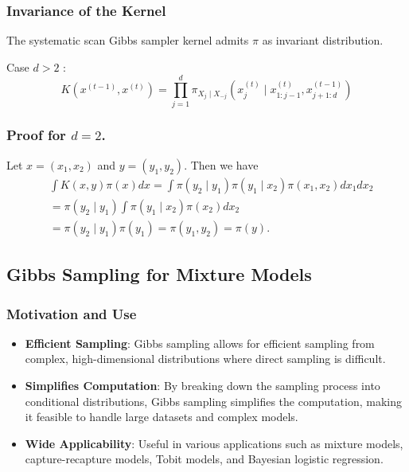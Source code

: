 \documentclass{article}
\begin{document}
\subsubsection{Invariance of the Kernel}
The systematic scan Gibbs sampler kernel admits $\pi$ as invariant distribution.

Case $d>2$ :
$$
K\left(x^{(t-1)}, x^{(t)}\right)=\prod_{j=1}^d \pi_{X_j \mid X_{-j}}\left(x_j^{(t)} \mid x_{1: j-1}^{(t)}, x_{j+1: d}^{(t-1)}\right)
$$

\subsubsection{Proof for $d=2$.}
Let $x=\left(x_1, x_2\right)$ and $y=\left(y_1, y_2\right)$. Then we have
$$
\begin{aligned}
& \int K(x, y) \pi(x) d x=\int \pi\left(y_2 \mid y_1\right) \pi\left(y_1 \mid x_2\right) \pi\left(x_1, x_2\right) d x_1 d x_2 \\
& =\pi\left(y_2 \mid y_1\right) \int \pi\left(y_1 \mid x_2\right) \pi\left(x_2\right) d x_2 \\
& =\pi\left(y_2 \mid y_1\right) \pi\left(y_1\right)=\pi\left(y_1, y_2\right)=\pi(y) .
\end{aligned}
$$

\subsection{Gibbs Sampling for Mixture Models}

\subsubsection*{Motivation and Use}
\begin{itemize}
    \item \textbf{Efficient Sampling}: Gibbs sampling allows for efficient sampling from complex, high-dimensional distributions where direct sampling is difficult.
    \item \textbf{Simplifies Computation}: By breaking down the sampling process into conditional distributions, Gibbs sampling simplifies the computation, making it feasible to handle large datasets and complex models.
    \item \textbf{Wide Applicability}: Useful in various applications such as mixture models, capture-recapture models, Tobit models, and Bayesian logistic regression.
\end{itemize}
\end{document}
